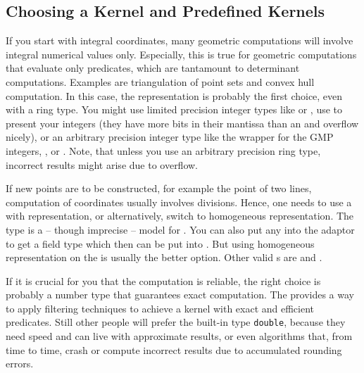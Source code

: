 \subsection{Choosing a Kernel and Predefined Kernels}
If you start with integral  coordinates,
many geometric computations will involve integral numerical values
only. Especially, this is true for geometric computations that
evaluate only predicates, which are tantamount to determinant
computations. Examples are triangulation of point sets and convex hull
computation.  In this case, the 
representation is probably the first choice, even with a ring type.
You might use limited precision integer types like  or
, use  to present your integers (they have more
bits in their mantissa than an  and overflow nicely), or an
arbitrary precision integer type like the wrapper  for the
GMP integers, , or . Note, that unless
you use an arbitrary precision ring type, incorrect results might
arise due to overflow.

If new points are to be constructed, for example the
 point of two lines, computation of
 coordinates usually involves divisions.
Hence, one needs to use a  with
 representation, or alternatively, switch
to homogeneous representation. The type  is a -- though
imprecise -- model for . You can also put any
 into the  adaptor to get a field type
which then can be put into . But using homogeneous
representation on the  is usually the better option.
Other valid s are  and
.

If it is crucial for you that the computation is reliable, the right
choice is probably a number type that guarantees exact computation.
The  provides a way to apply filtering techniques
\cite{cgal:bbp-iayed-01} to achieve a kernel with exact and efficient
predicates. %
Still other people will prefer the built-in
type {\tt double}, because they need speed and can live with
approximate results, or even algorithms that, from time to time,
crash or compute incorrect results due to accumulated rounding errors.

